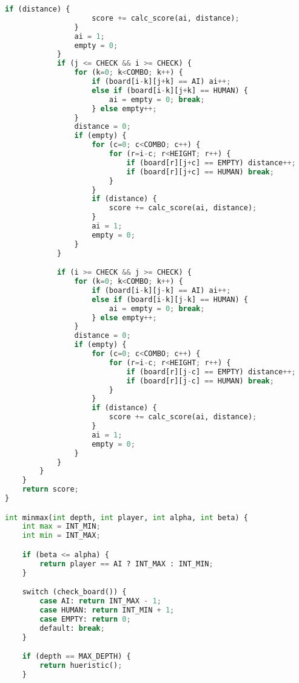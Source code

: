 \documentclass[11pt,letterpaper]{article}
\begin{document}
\begin{lstlisting}[language=Python]
                if (distance) {
                    score += calc_score(ai, distance);
                }
                ai = 1;
                empty = 0;
            }
            if (j <= CHECK && i >= CHECK) {
                for (k=0; k<COMBO; k++) {
                    if (board[i-k][j+k] == AI) ai++;
                    else if (board[i-k][j+k] == HUMAN) {
                        ai = empty = 0; break;
                    } else empty++;
                }
                distance = 0;
                if (empty) {
                    for (c=0; c<COMBO; c++) {
                        for (r=i-c; r<HEIGHT; r++) {
                            if (board[r][j+c] == EMPTY) distance++;
                            if (board[r][j+c] == HUMAN) break;
                        }
                    }
                    if (distance) {
                        score += calc_score(ai, distance);
                    }
                    ai = 1;
                    empty = 0;
                }
            }

            if (i >= CHECK && j >= CHECK) {
                for (k=0; k<COMBO; k++) {
                    if (board[i-k][j-k] == AI) ai++;
                    else if (board[i-k][j-k] == HUMAN) {
                        ai = empty = 0; break;
                    } else empty++;
                }
                distance = 0;
                if (empty) {
                    for (c=0; c<COMBO; c++) {
                        for (r=i-c; r<HEIGHT; r++) {
                            if (board[r][j-c] == EMPTY) distance++;
                            if (board[r][j-c] == HUMAN) break;
                        }
                    }
                    if (distance) {
                        score += calc_score(ai, distance);
                    }
                    ai = 1;
                    empty = 0;
                }
            }
        }
    }
    return score;
}

int minmax(int depth, int player, int alpha, int beta) {
    int max = INT_MIN;
    int min = INT_MAX;

    if (beta <= alpha) {
        return player == AI ? INT_MAX : INT_MIN;
    }

    switch (check_board()) {
        case AI: return INT_MAX - 1;
        case HUMAN: return INT_MIN + 1;
        case EMPTY: return 0;
        default: break;
    }

    if (depth == MAX_DEPTH) {
        return hueristic();
    }


\end{lstlisting}
\end{document}

